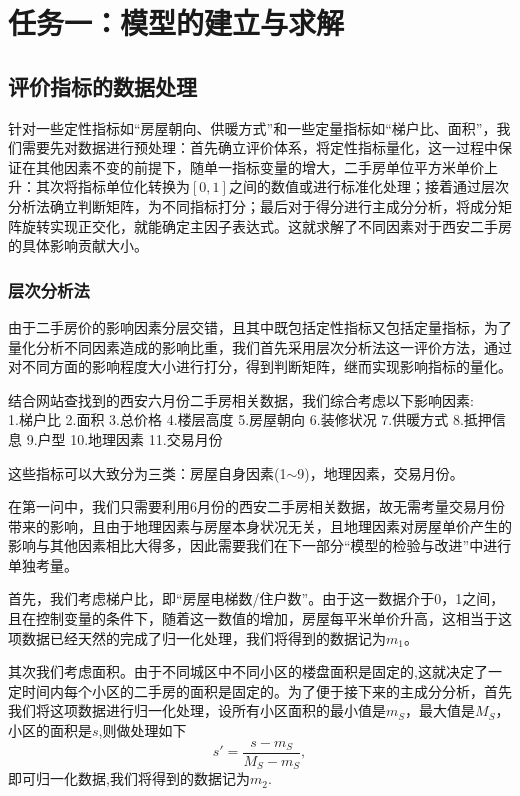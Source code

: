 \documentclass[withoutpreface,bwprint]{cumcmthesis} %
\begin{document}
\section{任务一：模型的建立与求解}

\subsection{评价指标的数据处理}
针对一些定性指标如“房屋朝向、供暖方式”和一些定量指标如“梯户比、面积”，我们需要先对数据进行预处理：首先确立评价体系，将定性指标量化，这一过程中保证在其他因素不变的前提下，随单一指标变量的增大，二手房单位平方米单价上升：其次将指标单位化转换为$[0,1]$之间的数值或进行标准化处理；接着通过层次分析法确立判断矩阵，为不同指标打分；最后对于得分进行主成分分析，将成分矩阵旋转实现正交化，就能确定主因子表达式。这就求解了不同因素对于西安二手房的具体影响贡献大小。
\subsubsection{层次分析法}
由于二手房价的影响因素分层交错，且其中既包括定性指标又包括定量指标，为了量化分析不同因素造成的影响比重，我们首先采用层次分析法这一评价方法，通过对不同方面的影响程度大小进行打分，得到判断矩阵，继而实现影响指标的量化。


结合网站查找到的西安六月份二手房相关数据，我们综合考虑以下影响因素:\\
1.梯户比
2.面积
3.总价格
4.楼层高度
5.房屋朝向
6.装修状况
7.供暖方式
8.抵押信息
9.户型
10.地理因素
11.交易月份

这些指标可以大致分为三类：房屋自身因素(1$\sim$9)，地理因素，交易月份。

在第一问中，我们只需要利用6月份的西安二手房相关数据，故无需考量交易月份带来的影响，且由于地理因素与房屋本身状况无关，且地理因素对房屋单价产生的影响与其他因素相比大得多，因此需要我们在下一部分“模型的检验与改进”中进行单独考量。

首先，我们考虑梯户比，即“房屋电梯数/住户数”。由于这一数据介于0，1之间，且在控制变量的条件下，随着这一数值的增加，房屋每平米单价升高，这相当于这项数据已经天然的完成了归一化处理，我们将得到的数据记为$m_1$。

其次我们考虑面积。由于不同城区中不同小区的楼盘面积是固定的,这就决定了一定时间内每个小区的二手房的面积是固定的。为了便于接下来的主成分分析，首先我们将这项数据进行归一化处理，设所有小区面积的最小值是$m_S$，最大值是$M_S$，小区的面积是$s$,则做处理如下
\begin{equation}
    s'=\frac{s-m_S}{M_S-m_S},
\end{equation}
即可归一化数据,我们将得到的数据记为$m_2$.
\end{document}
